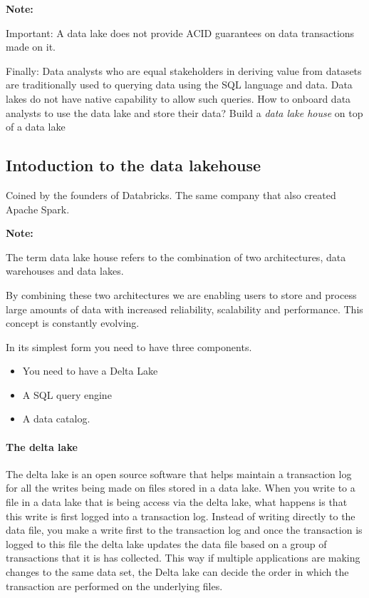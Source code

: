 \documentclass[a4paper, 11pt]{book}
\newenvironment{note}{
    \begin{siderule}
        \textbf{Note: }
        }{
    \end{siderule}}
\begin{document}
    \begin{note}
        Important: A data lake does not provide ACID guarantees on data transactions made on it.
    \end{note}

    Finally: Data analysts who are equal stakeholders in deriving value from datasets are traditionally used to querying data using the SQL language and data.
    Data lakes do not have native capability to allow such queries.
    How to onboard data analysts to use the data lake and store their data?
    Build a \textit{data lake house} on top of a data lake

    \subsection{Intoduction to the data lakehouse}

    Coined by the founders of Databricks. The same company that also created Apache Spark.

    \begin{note}
        The term data lake house refers to the combination of two architectures, data warehouses and data lakes.
    \end{note}
    By combining these two architectures we are enabling users to store and process large amounts of data with increased reliability, scalability and performance.
    This concept is constantly evolving.

    In its simplest form you need to have three components.
    \begin{itemize}
        \item You need to have a Delta Lake
        \item A SQL query engine
        \item A data catalog.
    \end{itemize}

    \paragraph{The delta lake}
    The delta lake is an open source software that helps maintain a transaction log for all the writes being made on files stored in a data lake.
    When you write to a file in a data lake that is being access via the delta lake, what happens is that this write is first logged into a transaction log.
    Instead of writing directly to the data file, you make a write first to the transaction log and once the transaction is logged to this file the delta lake updates the data file based on a group of transactions that it is has collected.
    This way if multiple applications are making changes to the same data set, the Delta lake can decide the order in which the transaction are performed on the underlying files.
\end{document}
